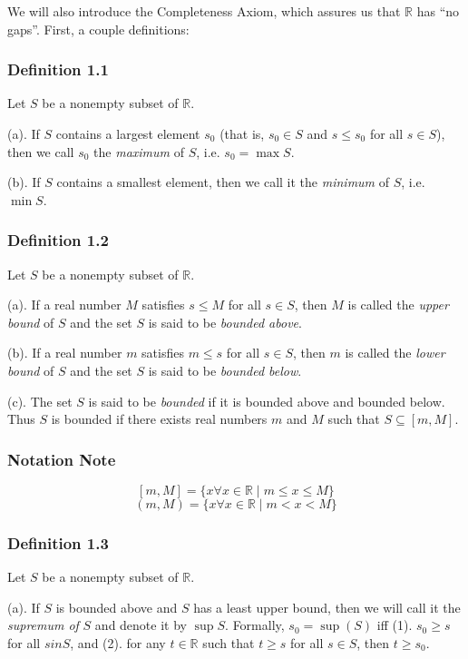 \documentclass[]{article}
\begin{document}
We will also introduce the Completeness Axiom, which assures us that
$\mathbb{R}$ has ``no gaps''. First, a couple definitions:

\subsubsection{Definition 1.1}

Let $S$ be a nonempty subset of $\mathbb{R}$.

(a). If $S$ contains a largest element $s_0$ (that is, $s_0 \in S$ and
$s \le s_0$ for all $s \in S$), then we call $s_0$ the \emph{maximum} of
$S$, i.e. $s_0 = \max S$.

(b). If $S$ contains a smallest element, then we call it the
\emph{minimum} of $S$, i.e. $\min S$.

\subsubsection{Definition 1.2}

Let $S$ be a nonempty subset of $\mathbb{R}$.

(a). If a real number $M$ satisfies $s \le M$ for all $s \in S$, then
$M$ is called the \emph{upper bound} of $S$ and the set $S$ is said to
be \emph{bounded above}.

(b). If a real number $m$ satisfies $m \le s$ for all $s \in S$, then
$m$ is called the \emph{lower bound} of $S$ and the set $S$ is said to
be \emph{bounded below}.

(c). The set $S$ is said to be \emph{bounded} if it is bounded above and
bounded below. Thus $S$ is bounded if there exists real numbers $m$ and
$M$ such that $S \subseteq [m,M]$.

\subsubsection{Notation Note}

\[ [m,M] = \{x \forall x \in \mathbb{R} \mid m \le x \le M \} \]
\[ (m,M) = \{x \forall x \in \mathbb{R} \mid m < x < M \} \]

\subsubsection{Definition 1.3}

Let $S$ be a nonempty subset of $\mathbb{R}$.

(a). If $S$ is bounded above and $S$ has a least upper bound, then we
will call it the \emph{supremum of} $S$ and denote it by $\sup S$.
Formally, $s_0 = \sup(S)$ iff (1). $s_0 \ge s$ for all $s in S$, and
(2). for any $t \in \mathbb{R}$ such that $t \ge s$ for all $s \in S$,
then $t \ge s_0$.
\end{document}
